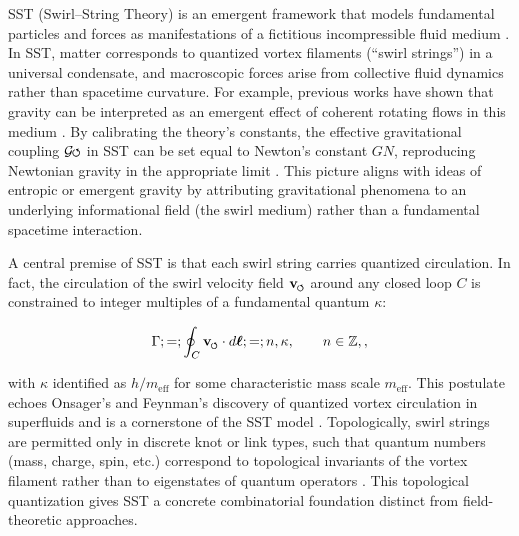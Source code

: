 \documentclass[12pt]{article}
\DeclareRobustCommand{\swirlarrow}{
\mathchoice{\mkern-2mu\scriptstyle\boldsymbol{\circlearrowleft}}%
{\mkern-2mu\scriptstyle\boldsymbol{\circlearrowleft}}%
{\mkern-2mu\scriptscriptstyle\boldsymbol{\circlearrowleft}}%
{\mkern-2mu\scriptscriptstyle\boldsymbol{\circlearrowleft}}
}%
\newcommand{\Gswirl}{\mathcal{G}\swirlarrow}
\begin{document}
SST (Swirl--String Theory) is an emergent framework that models fundamental particles and forces as manifestations of a fictitious incompressible fluid medium \cite{Iskandarani2025Canon}. In SST, matter corresponds to quantized vortex filaments (``swirl strings'') in a universal condensate, and macroscopic forces arise from collective fluid dynamics rather than spacetime curvature. For example, previous works have shown that gravity can be interpreted as an emergent effect of coherent rotating flows in this medium \cite{Iskandarani2025RotatingFrame}. By calibrating the theory's constants, the effective gravitational coupling $\Gswirl$ in SST can be set equal to Newton's constant $G{N}$, reproducing Newtonian gravity in the appropriate limit \cite{Iskandarani2025Canon}. This picture aligns with ideas of entropic or emergent gravity \cite{Verlinde2011,Verlinde2017,Jacobson1995,Padmanabhan2010} by attributing gravitational phenomena to an underlying informational field (the swirl medium) rather than a fundamental spacetime interaction.




A central premise of SST is that each swirl string carries quantized circulation. In fact, the circulation of the swirl velocity field $\mathbf{v}_{\swirlarrow}$ around any closed loop $C$ is constrained to integer multiples of a fundamental quantum $\kappa$:

\begin{equation}\label{eq:circulation}

\Gamma ;=; \oint_C \mathbf{v}_{\swirlarrow}\cdot d\boldsymbol{\ell} ;=; n,\kappa, \qquad n \in \mathbb{Z},,

\end{equation}

with $\kappa$ identified as $h/m_\text{eff}$ for some characteristic mass scale $m_\text{eff}$. This postulate echoes Onsager's and Feynman's discovery of quantized vortex circulation in superfluids and is a cornerstone of the SST model \cite{Onsager1949,Feynman1955}. Topologically, swirl strings are permitted only in discrete knot or link types, such that quantum numbers (mass, charge, spin, etc.) correspond to topological invariants of the vortex filament rather than to eigenstates of quantum operators \cite{Iskandarani2025Canon}. This topological quantization gives SST a concrete combinatorial foundation distinct from field-theoretic approaches.
\end{document}
